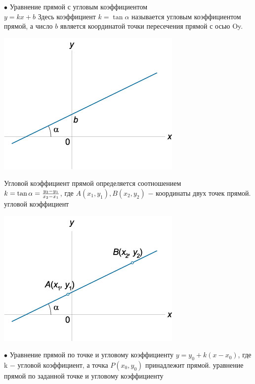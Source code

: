 \documentclass[oneside]{book}
\begin{document}
\begin{itemize}
\begin{enumerate}
$\bullet$ Уравнение прямой с угловым коэффициентом \\
$y = kx + b$
Здесь коэффициент $k = \tan\alpha$ называется угловым коэффициентом прямой, $а$ число $b$ является координатой точки пересечения прямой с осью Oy.

\begin{center}
\includegraphics[scale=0.4]{./pics/3.jpg}
\end{center}

Угловой коэффициент прямой определяется соотношением \\
$k = \tan \alpha = \large\frac{{{y_2} - {y_1}}}{{{x_2} - {x_1}}}\normalsize$,
где $A\left( {{x_1},{y_1}} \right), B\left( {{x_2},{y_2}} \right)$ − координаты двух точек прямой.
угловой коэффициент

\begin{center}
\includegraphics[scale=0.4]{./pics/4.jpg}
\end{center}

$\bullet$  Уравнение прямой по точке и угловому коэффициенту
$y = {y_0} + k\left( {x - {x_0}} \right)$,
где k − угловой коэффициент, а точка $P\left( {{x_0},{y_0}} \right)$ принадлежит прямой.
уравнение прямой по заданной точке и угловому коэффициенту


\end{enumerate}
\end{itemize}
\end{document}
